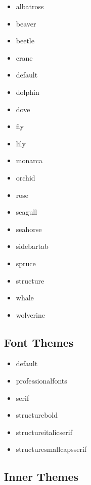 \ttfamily
\begin{multicols}{4}\raggedcolumns
\begin{itemize}
  \item albatross
  \item beaver
  \item beetle
  \item crane
  \item default
  \item dolphin
  \item dove
  \item fly
  \item lily
  \item monarca
  \item orchid
  \item rose
  \item seagull
  \item seahorse
  \item sidebartab
  \item spruce
  \item structure
  \item whale
  \item wolverine
\end{itemize}
\end{multicols}
\normalfont

\subsection{Font Themes}\label{subsec:font-themes}

\ttfamily
\begin{multicols}{4}\raggedcolumns
\begin{itemize}
  \item default
  \item professionalfonts
  \item serif
  \item structurebold
  \item structureitalicserif
  \item structuresmallcapsserif
\end{itemize}
\end{multicols}
\normalfont

\subsection{Inner Themes}\label{subsec:inner-themes}

